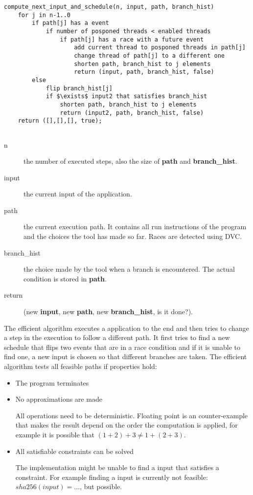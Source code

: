 \documentclass[10pt]{llncs}
\begin{document}
\begin{lstlisting}[mathescape,tabsize=2,basicstyle=\small]
compute_next_input_and_schedule(n, input, path, branch_hist)
	for j in n-1..0
		if path[j] has a event
			if number of posponed threads < enabled threads
				if path[j] has a race with a future event
					add current thread to posponed threads in path[j]
					change thread of path[j] to a different one
					shorten path, branch_hist to j elements
					return (input, path, branch_hist, false)
		else
			flip branch_hist[j]
			if $\exists$ input2 that satisfies branch_hist
				shorten path, branch_hist to j elements
				return (input2, path, branch_hist, false)
	return ([],[],[], true);
			
\end{lstlisting}

\begin{description}
	\item[n] the number of executed steps, also the size of \textbf{path} and \textbf{branch\_hist}.
	\item[input] the current input of the application.
	\item[path] the current execution path. It contains all run instructions of the program and the choices the tool has made so far. Races are detected using DVC.
	\item[branch\_hist] the choice made by the tool when a branch is encountered. The actual condition is stored in \textbf{path}.
	\item[return] (new \textbf{input}, new \textbf{path}, new \textbf{branch\_hist}, is it done?).
\end{description}

The efficient algorithm executes a application to the end and then tries to change a step in the execution to follow a different path. It first tries to find a new schedule that flips two events that are in a race condition and if it is unable to find one, a new input is chosen so that different branches are taken. The efficient algorithm tests all feasible paths if properties hold:

\begin{itemize}
	\item The program terminates
	\item No approximations are made
	
	All operations need to be deterministic. Floating point is an counter-example that makes the result depend on the order the computation is applied, for example it is possible that $(1+2)+3 \neq 1+(2+3)$.
	\item All satisfiable constraints can be solved
	
	The implementation might be unable to find a input that satisfies a constraint. For example finding a input is currently not feasible: $sha256(input) = \dots$, but possible.
\end{itemize}
\end{document}
